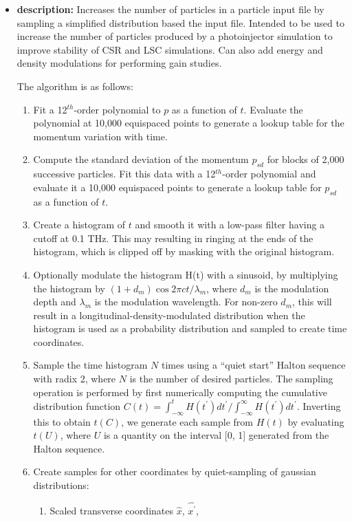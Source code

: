 \documentclass[11pt]{article}
\begin{document}
\begin{itemize}
\item {\bf description:} Increases the number of particles in a particle input file by
 sampling a simplified distribution based the input file.  Intended to be used to increase the number of particles
 produced by a photoinjector simulation to improve stability of CSR and LSC simulations.
 Can also add energy and density modulations for performing gain studies.

The algorithm is as follows:
\begin{enumerate}
\item Fit a 12$^{th}$-order polynomial to $p$ as a function of $t$.  Evaluate
 the polynomial at 10,000 equispaced points to generate a lookup table for the momentum
 variation with time.
\item Compute the standard deviation of the momentum $p_{sd}$ for blocks of 2,000 successive
 particles.  Fit this data with a 12$^{th}$-order polynomial and evaluate 
 it a 10,000 equispaced points to generate a lookup table for $p_{sd}$ as a function of $t$.
\item Create a histogram of $t$ and smooth it with a low-pass filter having a cutoff at
 0.1 THz.  This may resulting in ringing at the ends of the histogram, which is clipped off
 by masking with the original histogram. 
\item Optionally modulate the histogram H(t) with a sinusoid, by
 multiplying the histogram by $(1 + d_m) \cos 2\pi c t/\lambda_m$, where $d_m$
 is the modulation depth and $\lambda_m$ is the modulation wavelength. For non-zero $d_m$,
 this will result in a longitudinal-density-modulated distribution when the histogram is
 used as a probability distribution and sampled to create time coordinates.
\item Sample the time histogram $N$ times using a ``quiet start'' Halton sequence with
 radix 2, where $N$ is the number of desired particles.  The sampling
 operation is performed by first numerically computing the cumulative
 distribution function $C(t)=\int_{-\infty}^t H(t^\prime)
 dt^\prime/\int_{-\infty}^\infty H(t^\prime) dt^\prime$.  Inverting
 this to obtain $t(C)$, we generate each sample from $H(t)$ by
 evaluating $t(U)$, where $U$ is a quantity on the interval [0, 1] generated
 from the Halton sequence.
\item Create samples for other coordinates by quiet-sampling of gaussian distributions:
 \begin{enumerate}
 \item Scaled transverse coordinates $\hat{x}$, $\hat{x^\prime}$,

\end{enumerate}
\end{enumerate}
\end{itemize}
\end{document}
